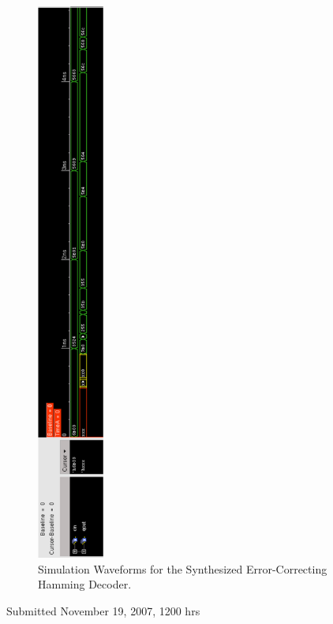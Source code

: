 \documentclass[ee577b,acmnow]{acmtrans2m}
\begin{document}
\hspace{-2cm}\begin{figure}
\begin{center}
\includegraphics[height=18.5cm]{postdec}
\caption{Simulation Waveforms for the Synthesized Error-Correcting Hamming Decoder.}
\label{postdecoder}
\end{center}
\end{figure}




%
%

\begin{received}
Submitted November 19, 2007, 1200 hrs
\end{received}
\end{document}
